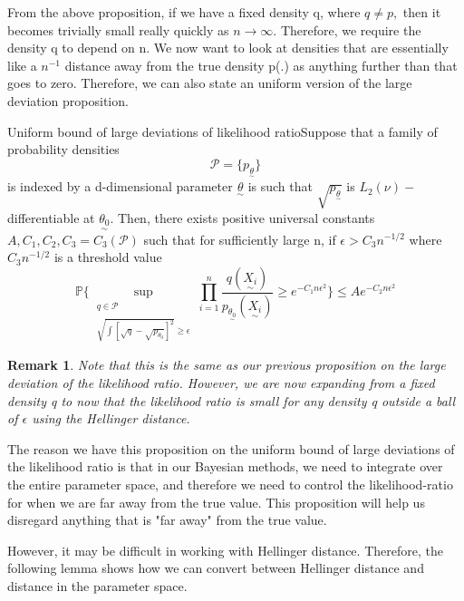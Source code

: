\documentclass[twoside]{article}
\newtheorem{remark}[theorem]{Remark}
\newcommand{\utilde}{\underset{\sim}}
\begin{document}
From the above proposition, if we have a fixed density q, where $q \neq p,$ then it becomes trivially small really quickly as $n \rightarrow \infty.$ Therefore, we require the density q to depend on n. We now want to look at densities that are essentially like a $n^{-1}$ distance away from the true density p(.) as anything further than that goes to zero. Therefore, we can also state an uniform version of the large deviation proposition.
\begin{proposition_exam}{Uniform bound of large deviations of likelihood ratio}{}Suppose that a family of probability densities 
$$
\mathcal{P} = \{p_{\utilde{\theta}}\}
$$
is indexed by a d-dimensional parameter $\utilde{\theta}$ is such that $\sqrt{p_{\utilde{\theta}}}$ is $L_2(\nu)-$differentiable at $\utilde{\theta_0}.$ Then, there exists positive universal constants $A, C_1, C_2, C_3 = C_3(\mathcal{P})$ such that for sufficiently large n, if $\epsilon > C_3n^{-1/2}$ where $C_3n^{-1/2}$ is a threshold value
$$
\mathbb{P}\bigg\{
  \sup_{\substack{q \in \mathcal{P}\\\\ \sqrt{\int[\sqrt{q} - \sqrt{p_{\theta_0}}]^2}  \geq \epsilon}} \prod_{i=1}^{n}\frac{q(\utilde{X_i})}{p_{\utilde{\theta_{0}}}(\utilde{X_i})} \geq e^{-C_1n\epsilon^2} \bigg\} \leq Ae^{-C_2n\epsilon^2}
$$
\end{proposition_exam}

\begin{remark}Note that this is the same as our previous proposition on the large deviation of the likelihood ratio. However, we are now expanding from a fixed density q to now that the likelihood ratio is small for any density q outside a ball of $\epsilon$ using the Hellinger distance.
\end{remark}

The reason we have this proposition on the uniform bound of large deviations of the likelihood ratio is that in our Bayesian methods, we need to integrate over the entire parameter space, and therefore we need to control the likelihood-ratio for when we are far away from the true value. This proposition will help us disregard anything that is "far away" from the true value.

However, it may be difficult in working with Hellinger distance. Therefore, the following lemma shows how we can convert between Hellinger distance and distance in the parameter space.
\end{document}
